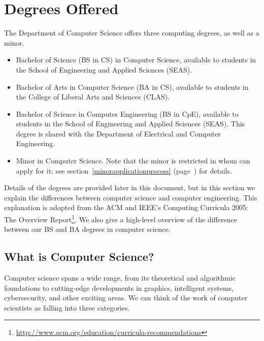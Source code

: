 \documentclass[10pt,letter,twocolumn]{book}
\newenvironment{itemlist}{
\begin{itemize}
\setlength{\itemsep}{0pt}
\setlength{\parskip}{0pt}}
{\end{itemize}}
\newcommand{\mysection}[1]{\section{#1}\renewcommand{\rightmark}{#1}}
\newcommand{\myurl}[1]{\footnote{\scriptsize\url{#1}}}
\begin{document}
\mysection{Degrees Offered}

The Department of Computer Science offers three computing degrees, as well as a minor.

\begin{itemlist}
\item Bachelor of Science (BS in CS) in Computer Science, available to
  students in the School of Engineering and Applied Sciences (SEAS).
\item Bachelor of Arts in Computer Science (BA in CS), available to
  students in the College of Liberal Arts and Sciences (CLAS).
\item Bachelor of Science in Computer Engineering (BS in CpE),
  available to students in the School of Engineering and Applied
  Sciences (SEAS). This degree is shared with the Department of
  Electrical and Computer Engineering.
\item Minor in Computer Science.  Note that the minor is restricted in
  whom can apply for it; see section~\ref{minorapplicationprocess}
  (page~\pageref{minorapplicationprocess}) for details.
\end{itemlist}

Details of the degrees are provided later in this document, but in
this section we explain the differences between computer science and
computer engineering. This explanation is adopted from the ACM and
IEEE's Computing Curricula 2005: The Overview
Report\myurl{http://www.acm.org/education/curricula-recommendations}. We
also give a high-level overview of the difference between our BS and
BA degrees in computer science.

\subsection{What is Computer Science?}

Computer science spans a wide range, from its theoretical and
algorithmic foundations to cutting-edge developments in graphics,
intelligent systems, cybersecurity, and other exciting areas. We can
think of the work of computer scientists as falling into three
categories.
\end{document}
